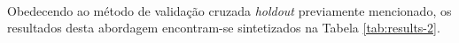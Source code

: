 \begin{figure}[hb!]
\begin{subfigure}[hb]{0.5\linewidth}
		\end{subfigure}\\
	\end{figure}



	Obedecendo ao método de validação cruzada \emph{holdout} previamente mencionado, os resultados desta abordagem encontram-se sintetizados na Tabela \ref{tab:results-2}.

